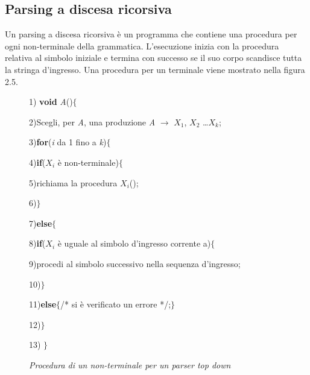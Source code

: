 \subsection{Parsing a discesa ricorsiva}
Un parsing a discesa ricorsiva è un programma che contiene una procedura per ogni non-terminale della grammatica. L'esecuzione \cite{libro: compilatori} inizia con la procedura relativa al simbolo iniziale e termina con successo se il suo corpo scandisce tutta la stringa d'ingresso. Una procedura per un terminale viene mostrato nella figura 2.5.
\begin{figure}[hbpb]
	1) \textbf{void} \textit{A}()$\{$\par
	2)\hspace{0.5cm}Scegli, per \textit{A}, una produzione \textit{A} $\to$ $X_1$, $X_2$ \dots $X_k$;\par
	3)\hspace{0.5cm}\textbf{for}(\textit{i} da 1 fino a \textit{k})$\{$\par
	4)\hspace{1.1cm}\textbf{if}($X_i$ è non-terminale)$\{$\par
	5)\hspace{1.4cm}richiama la procedura $X_i$();\par
	6)\hspace{1.1cm}$\}$\par		
	7)\hspace{1.1cm}\textbf{else}$\{$\par	
	8)\hspace{1.3cm}\textbf{if}($X_i$ è uguale al simbolo d'ingresso corrente a)$\{$\par
	9)\hspace{2.0cm}procedi al simbolo successivo nella sequenza d'ingresso;\par
   10)\hspace{1.3cm}$\}$\par
   11)\hspace{1.4cm}\textbf{else}$\{$/* si è verificato un errore */;$\}$\par
   12)\hspace{0.5cm}$\}$\par
   13) $\}$\par
	\caption{\textit{Procedura di un non-terminale per un parser top down}}\label{fig:code}
\end{figure}

